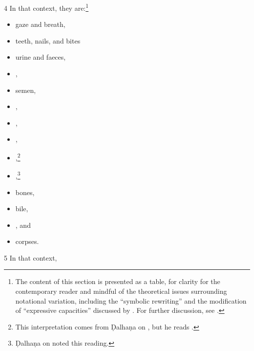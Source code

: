 \begin{translation}
 \item[4] In that context, they are:\footnote{The content of this section is
    presented as a table, for clarity for the contemporary reader and mindful of the
    theoretical issues surrounding notational variation, including the “symbolic
    rewriting” and the modification of “expressive capacities” discussed by
    \citet[321\,ff]{saru-2016}.  For further discussion, see
    \cite[81--83]{wuja-2021}.}
 \begin{multicols}{2}
 \begin{itemize}
     \item gaze and breath,
     \item teeth, nails, and bites
     \item  urine and faeces,
     \item {},
     \item semen,
     \item {}, %
     \item {}, %
     \item {},
     \item {},\footnote{This interpretation comes from
     Ḍalhaṇa on , but he reads .}
     \item {},\footnote{Ḍalhaṇa on  noted this reading.}
     \item bones,
     \item bile,
     \item {},
and 
     \item corpses.
     \end{itemize}
    \end{multicols}
\item[5] 
In that context,



\end{translation}
